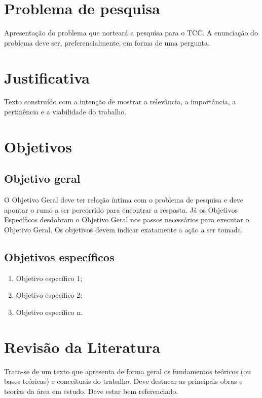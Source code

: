 \documentclass{ifto-tex}
\begin{document}
\chapter{Problema de pesquisa}
	
		Apresentação do problema que norteará a pesquisa para o TCC. A enunciação do problema deve ser,	preferencialmente, em forma de uma pergunta.
	
\chapter{Justificativa}
	
		Texto construído com a intenção de mostrar	a relevância, a importância, a pertinência e a viabilidade do trabalho.
	
\chapter{Objetivos}
	
	\section{Objetivo geral}
	
		O Objetivo Geral deve ter relação íntima com o problema de	pesquisa e deve apontar o rumo a ser percorrido para encontrar a resposta. Já os	Objetivos Específicos desdobram o Objetivo Geral nos passos necessários para executar o	Objetivo Geral. Os objetivos devem indicar	exatamente a ação a ser tomada.
	
	\section{Objetivos específicos}
	
		\begin{enumerate}
			\item Objetivo específico 1;
			\item Objetivo específico 2;
			\item Objetivo específico n.
		\end{enumerate}

\chapter{Revisão da Literatura}
	
	Trata-se de um texto que apresenta de forma	geral os fundamentos teóricos (ou bases	teóricas) e conceituais do trabalho. Deve destacar as principais obras e teorias da área em estudo. Deve estar bem referenciado.
	
\end{document}
